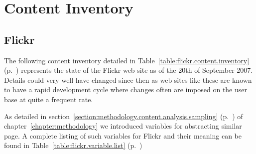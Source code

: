 \chapter{Content Inventory}
\label{appendix:content.inventory}

\section{Flickr}

The following content inventory detailed in
Table~\ref{table:flickr.content.inventory}
(p.~\pageref{table:flickr.content.inventory})
represents the state of the Flickr web site as of the 20th of September 2007.
Details could very well have changed since then as
web sites like these are known to have a rapid development cycle
where changes often are imposed on the user base at quite
a frequent rate.

As detailed in
section~\ref{section:methodology.content.analysis.sampling}
(p.~\pageref{section:methodology.content.analysis.sampling})
of chapter~\ref{chapter:methodology} we introduced variables for abstracting
similar page. A complete listing of such variables for Flickr and their
meaning can be found in
Table~\ref{table:flickr.variable.list}
(p.~\pageref{table:flickr.variable.list})

